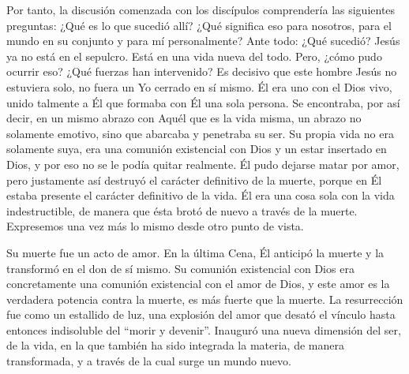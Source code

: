 			\begin{body}Por tanto, la discusión comenzada con los discípulos comprendería las siguientes preguntas: ¿Qué es lo que sucedió allí? ¿Qué significa eso para nosotros, para el mundo en su conjunto y para mí personalmente? Ante todo: ¿Qué sucedió? Jesús ya no está en el sepulcro. Está en una vida nueva del todo. Pero, ¿cómo pudo ocurrir eso? ¿Qué fuerzas han intervenido? Es decisivo que este hombre Jesús no estuviera solo, no fuera un Yo cerrado en sí mismo. Él era uno con el Dios vivo, unido talmente a Él que formaba con Él una sola persona. Se encontraba, por así decir, en un mismo abrazo con Aquél que es la vida misma, un abrazo no solamente emotivo, sino que abarcaba y penetraba su ser. Su propia vida no era solamente suya, era una comunión existencial con Dios y un estar insertado en Dios, y por eso no se le podía quitar realmente. Él pudo dejarse matar por amor, pero justamente así destruyó el carácter definitivo de la muerte, porque en Él estaba presente el carácter definitivo de la vida. Él era una cosa sola con la vida indestructible, de manera que ésta brotó de nuevo a través de la muerte. Expresemos una vez más lo mismo desde otro punto de vista.\end{body}
			
			\begin{body}Su muerte fue un acto de amor. En la última Cena, Él anticipó la muerte y la transformó en el don de sí mismo. Su comunión existencial con Dios era concretamente una comunión existencial con el amor de Dios, y este amor es la verdadera potencia contra la muerte, es más fuerte que la muerte. La resurrección fue como un estallido de luz, una explosión del amor que desató el vínculo hasta entonces indisoluble del “morir y devenir”. Inauguró una nueva dimensión del ser, de la vida, en la que también ha sido integrada la materia, de manera transformada, y a través de la cual surge un mundo nuevo.\end{body}
			
